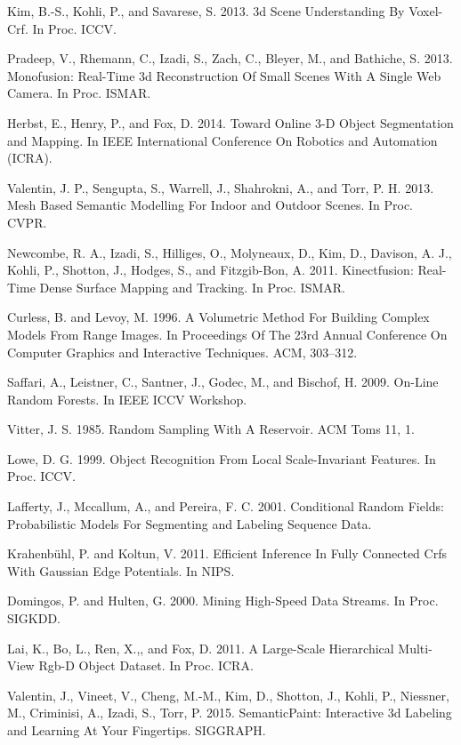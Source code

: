 \documentclass{llncs}
\begin{document}

\begin{thebibliography}{1}

  Kim, B.-S., Kohli, P., and Savarese, S. 2013. 3d Scene Understanding By Voxel-Crf. In Proc. ICCV.

  Pradeep, V., Rhemann, C., Izadi, S., Zach, C., Bleyer, M., and Bathiche, S. 2013. Monofusion: Real-Time 3d Reconstruction Of Small Scenes With A Single Web Camera. In Proc. ISMAR.

  Herbst, E., Henry, P., and Fox, D. 2014. Toward Online 3-D Object Segmentation and Mapping. In IEEE International Conference On Robotics and Automation (ICRA).

  Valentin, J. P., Sengupta, S., Warrell, J., Shahrokni, A., and Torr, P. H. 2013. Mesh Based Semantic Modelling For Indoor and Outdoor Scenes. In Proc. CVPR.

  Newcombe, R. A., Izadi, S., Hilliges, O., Molyneaux, D., Kim, D., Davison, A. J., Kohli, P., Shotton, J., Hodges, S., and Fitzgib-Bon, A. 2011. Kinectfusion: Real-Time Dense Surface Mapping and Tracking. In Proc. ISMAR.

  Curless, B. and Levoy, M. 1996. A Volumetric Method For Building Complex Models From Range Images. In Proceedings Of The 23rd Annual Conference On Computer Graphics and Interactive Techniques. ACM, 303–312.

  Saffari, A., Leistner, C., Santner, J., Godec, M., and Bischof, H. 2009. On-Line Random Forests. In IEEE ICCV Workshop.

  Vitter, J. S. 1985. Random Sampling With A Reservoir. ACM Toms 11, 1.

  Lowe, D. G. 1999. Object Recognition From Local Scale-Invariant Features. In Proc. ICCV.

  Lafferty, J., Mccallum, A., and Pereira, F. C. 2001. Conditional Random Fields: Probabilistic Models For Segmenting and Labeling Sequence Data.

  Krahenbühl, P. and Koltun, V. 2011. Efficient Inference In Fully Connected Crfs With Gaussian Edge Potentials. In NIPS.

  Domingos, P. and Hulten, G. 2000. Mining High-Speed Data Streams. In Proc. SIGKDD.

  Lai, K., Bo, L., Ren, X.,, and Fox, D. 2011. A Large-Scale Hierarchical Multi-View Rgb-D Object Dataset. In Proc. ICRA.

  Valentin, J., Vineet, V., Cheng, M.-M., Kim, D., Shotton, J., Kohli, P., Niessner, M., Criminisi, A., Izadi, S., Torr, P. 2015. SemanticPaint: Interactive 3d Labeling and Learning At Your Fingertips. SIGGRAPH.

\end{thebibliography}
\end{document}
